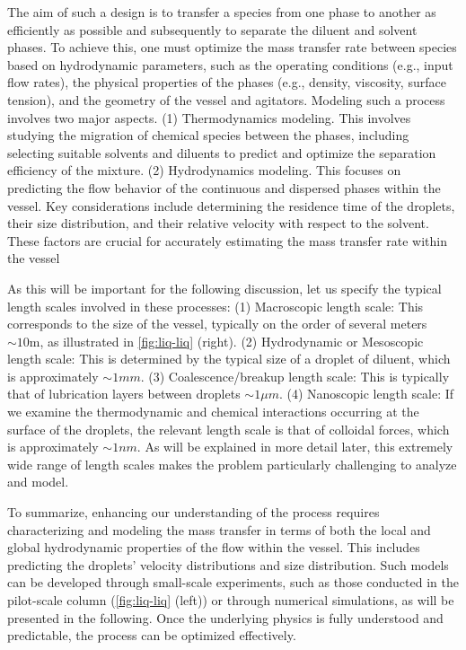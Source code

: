 The aim of such a design is to transfer a species from one phase to another as efficiently as possible and subsequently to separate the diluent and solvent phases.
To achieve this, one must optimize the mass transfer rate between species based on hydrodynamic parameters, such as the operating conditions (e.g., input flow rates), the physical properties of the phases (e.g., density, viscosity, surface tension), and the geometry of the vessel and agitators.
Modeling such a process involves two major aspects.
(1) Thermodynamics modeling. This involves studying the migration of chemical species between the phases, including selecting suitable solvents and diluents to predict and optimize the separation efficiency of the mixture.
(2) Hydrodynamics modeling. This focuses on predicting the flow behavior of the continuous and dispersed phases within the vessel. Key considerations include determining the residence time of the droplets, their size distribution, and their relative velocity with respect to the solvent. These factors are crucial for accurately estimating the mass transfer rate within the vessel



As this will be important for the following discussion, let us specify the typical length scales involved in these processes:
(1) Macroscopic length scale: This corresponds to the size of the vessel, typically on the order of several meters $\sim 10 \text{m}$, as illustrated in \ref{fig:liq-liq} (right). 
(2) Hydrodynamic or Mesoscopic length scale: This is determined by the typical size of a droplet of diluent, which is approximately $\sim 1 mm$. 
(3) Coalescence/breakup length scale: This is typically that of lubrication layers between droplets $\sim 1 \mu m$. 
(4) Nanoscopic length scale: If we examine the thermodynamic and chemical interactions occurring at the surface of the droplets, the relevant length scale is that of colloidal forces, which is approximately $\sim 1 nm$. 
As will be explained in more detail later, this extremely wide range of length scales makes the problem particularly challenging to analyze and model. 

To summarize, enhancing our understanding of the process requires characterizing and modeling the mass transfer in terms of both the local and global hydrodynamic properties of the flow within the vessel. 
This includes predicting the droplets' velocity distributions and size distribution. 
Such models can be developed through small-scale experiments, such as those conducted in the pilot-scale column (\ref{fig:liq-liq} (left)) or through numerical simulations, as will be presented in the following. 
Once the underlying physics is fully understood and predictable, the process can be optimized effectively.


